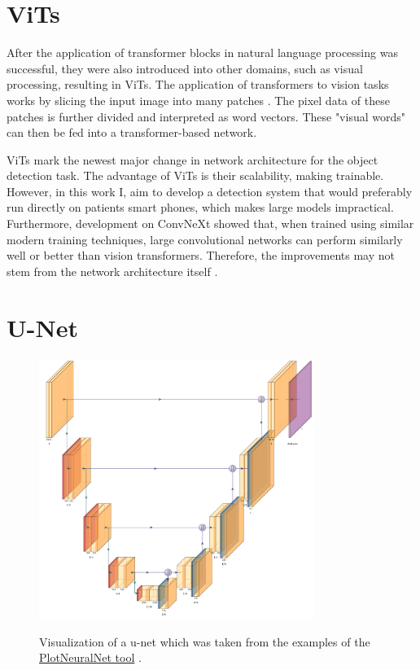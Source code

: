 \documentclass[10pt]{book}
\begin{document}

\section{ViTs}

After the application of transformer blocks in natural language processing was successful, they were also introduced into other domains, such as visual processing, resulting in \acp{ViT}. The application of transformers to vision tasks works by slicing the input image into many patches \cite{dosovitskiy2020image}. The pixel data of these patches is further divided and interpreted as word vectors. These "visual words" can then be fed into a transformer-based network.

\acp{ViT} mark the newest major change in network architecture for the object detection task. The advantage of \acp{ViT} is their scalability, making \cite[models of unprecedented size]{dosovitskiy2020image} trainable. However, in this work I, aim to develop a detection system that would preferably run directly on patients smart phones, which makes large models impractical. Furthermore, development on ConvNeXt showed that, when trained using similar modern training techniques, large convolutional networks can perform similarly well or better than vision transformers. Therefore, the improvements may not stem from the network architecture itself \cite{liu2022convnet}.

\section{U-Net}

\begin{figure}
  \caption{Visualization of a u-net which was taken from the examples of the \href{https://github.com/HarisIqbal88/PlotNeuralNet}{PlotNeuralNet tool} \cite{haris_iqbal_2018_2526396}.}
  \includegraphics[width=0.8\textwidth]{image/Unet_ushape}
  \label{fig:unet}
\end{figure}
\end{document}
